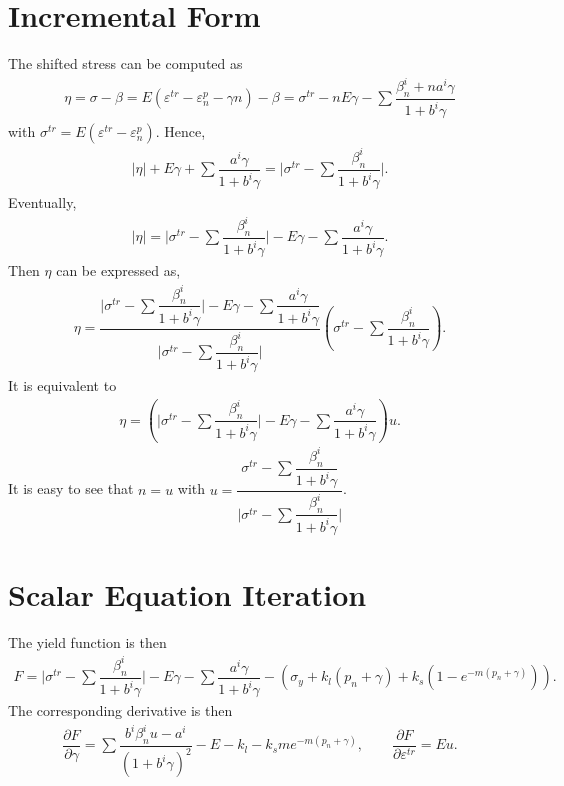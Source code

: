 \documentclass[a4paper,10pt,fleqn]{article}
\newcommand*{\pfrac}[2]{\dfrac{\partial#1}{\partial#2}}
\begin{document}
\section{Incremental Form}
The shifted stress can be computed as
\begin{gather}
\eta=\sigma-\beta=E\left(\varepsilon^{tr}-\varepsilon^p_n-\gamma{}n\right)-\beta=\sigma^{tr}-nE\gamma-\sum\dfrac{\beta_n^i+na^i\gamma}{1+b^i\gamma}
\end{gather}
with $\sigma^{tr}=E(\varepsilon^{tr}-\varepsilon^p_n)$. Hence,
\begin{gather*}
\Big|\eta\Big|+E\gamma+\sum\dfrac{a^i\gamma}{1+b^i\gamma}=\Big|\sigma^{tr}-\sum\dfrac{\beta_n^i}{1+b^i\gamma}\Big|.
\end{gather*}
Eventually,
\begin{gather}
\Big|\eta\Big|=\Big|\sigma^{tr}-\sum\dfrac{\beta_n^i}{1+b^i\gamma}\Big|-E\gamma-\sum\dfrac{a^i\gamma}{1+b^i\gamma}.
\end{gather}
Then $\eta$ can be expressed as,
\begin{gather*}
\eta=\dfrac{\Big|\sigma^{tr}-\sum\dfrac{\beta_n^i}{1+b^i\gamma}\Big|-E\gamma-\sum\dfrac{a^i\gamma}{1+b^i\gamma}}{\Big|\sigma^{tr}-\sum\dfrac{\beta_n^i}{1+b^i\gamma}\Big|}\left(\sigma^{tr}-\sum\dfrac{\beta_n^i}{1+b^i\gamma}\right).
\end{gather*}
It is equivalent to
\begin{gather*}
\eta=\left(\Big|\sigma^{tr}-\sum\dfrac{\beta_n^i}{1+b^i\gamma}\Big|-E\gamma-\sum\dfrac{a^i\gamma}{1+b^i\gamma}\right)u.
\end{gather*}
It is easy to see that $n=u$ with $\displaystyle{}u=\dfrac{\sigma^{tr}-\sum\dfrac{\beta_n^i}{1+b^i\gamma}}{\Big|\sigma^{tr}-\sum\dfrac{\beta_n^i}{1+b^i\gamma}\Big|}$.
\section{Scalar Equation Iteration}
The yield function is then
\begin{gather}
F=\Big|\sigma^{tr}-\sum\dfrac{\beta_n^i}{1+b^i\gamma}\Big|-E\gamma-\sum\dfrac{a^i\gamma}{1+b^i\gamma}-\left(\sigma_y+k_l\left(p_n+\gamma\right)+k_s\left(1-e^{-m\left(p_n+\gamma\right)}\right)\right).
\end{gather}
The corresponding derivative is then
\begin{gather}
\pfrac{F}{\gamma}=\sum\dfrac{b^i\beta_n^iu-a^i}{(1+b^i\gamma)^2}-E-k_l-k_sme^{-m\left(p_n+\gamma\right)},\qquad
\pfrac{F}{\varepsilon^{tr}}=Eu.
\end{gather}
\end{document}
